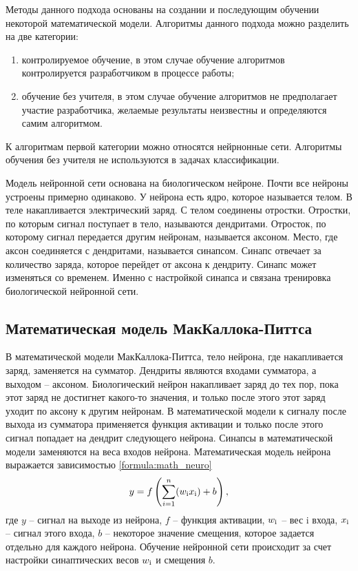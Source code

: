 Методы данного подхода основаны на создании и последующим обучении некоторой математической модели. Алгоритмы данного подхода можно разделить на две категории:
\begin{enumerate}
	\item контролируемое обучение, в этом случае обучение алгоритмов контролируется разработчиком в процессе работы;
	\item обучение без учителя, в этом случае обучение алгоритмов не предполагает участие разработчика, желаемые результаты неизвестны и определяются самим алгоритмом.
\end{enumerate}

К алгоритмам первой категории можно относятся нейрнонные сети. Алгоритмы обучения без учителя не используются в задачах классификации.

Модель нейронной сети основана на биологическом нейроне. Почти все нейроны устроены примерно одинаково. У нейрона есть ядро, которое называется телом. В теле накапливается электрический заряд. С телом соединены отростки. Отростки, по которым сигнал поступает в тело, называются дендритами. Отросток, по которому сигнал передается другим нейронам, называется аксоном. Место, где аксон соединяется с дендритами, называется синапсом. Синапс отвечает за количество заряда, которое перейдет от аксона к дендриту. Синапс может изменяться со временем. Именно с настройкой синапса и связана тренировка биологической нейронной сети.

\subsection{Математическая модель МакКаллока-Питтса}
В математической модели МакКаллока-Питтса, тело нейрона, где накапливается заряд, заменяется на сумматор. Дендриты являются входами сумматора, а выходом -- аксоном. Биологический нейрон накапливает заряд до тех пор, пока этот заряд не достигнет какого-то значения, и только после этого этот заряд уходит по аксону к другим нейронам. В математической модели к сигналу после выхода из сумматора применяется функция активации и только после этого сигнал попадает на дендрит следующего нейрона. Синапсы в математической модели заменяются на веса входов нейрона. Математическая модель нейрона выражается зависимостью \ref{formula:math_neuro}
\begin{equation}\label{formula:math_neuro}
y = f\left(\sum\limits_{i = 1}^{n}(w_{\rm{i}}x_{\rm{i}}) + b\right),
\end{equation}
где $y$ -- сигнал на выходе из нейрона, $f$ -- функция активации, $w_{\rm{i}}$ -- вес i входа, $x_{\rm{i}}$ -- сигнал этого входа, $b$ -- некоторое значение смещения, которое задается отдельно для каждого нейрона. Обучение нейронной сети происходит за счет настройки синаптических весов $w_{\rm{i}}$ и смещения $b$.

